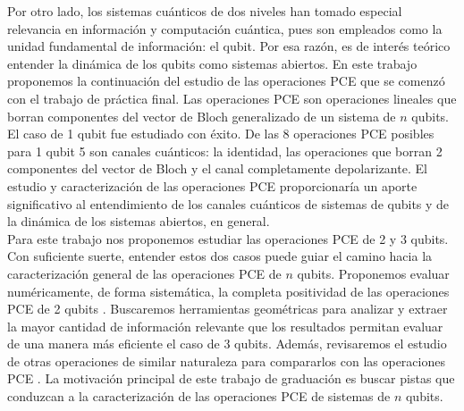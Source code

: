 Por otro lado, los sistemas cuánticos de dos niveles han tomado especial
relevancia en información y computación cuántica, pues son empleados 
como la unidad fundamental de información: el qubit. Por esa razón, es
de interés teórico entender la dinámica de los qubits como sistemas 
abiertos. En este trabajo proponemos la continuación del estudio de 
las operaciones PCE que se comenzó con el trabajo de práctica final.
Las operaciones PCE son operaciones lineales que borran componentes
del vector de Bloch generalizado de un sistema de $n$ qubits. El caso 
de 1 qubit fue estudiado con éxito. De las 8 operaciones PCE posibles para
1 qubit 5 son canales cuánticos: la identidad, las operaciones que borran 2 
componentes del vector de Bloch y el canal completamente depolarizante.
El estudio y caracterización de las operaciones PCE proporcionaría 
un aporte significativo al entendimiento de los canales cuánticos de
sistemas de qubits y de la dinámica de los sistemas abiertos, en general.\\

Para este trabajo nos proponemos estudiar las operaciones PCE de 
2 y 3 qubits. Con suficiente suerte, entender estos dos casos
puede guiar el camino hacia la caracterización general de las operaciones
PCE de $n$ qubits. Proponemos evaluar numéricamente, de forma sistemática, 
la completa positividad de las operaciones PCE de 2 qubits . Buscaremos
herramientas geométricas para analizar y extraer la mayor cantidad de
información relevante que los resultados permitan evaluar de una manera
más eficiente el caso de 3 qubits. Además, revisaremos el 
estudio de otras operaciones de similar naturaleza para compararlos
con las operaciones PCE \cite{nathanson2007pauli}. 
La motivación principal de este trabajo de graduación 
es buscar pistas que conduzcan a la caracterización de las 
operaciones PCE de sistemas de $n$ qubits.


